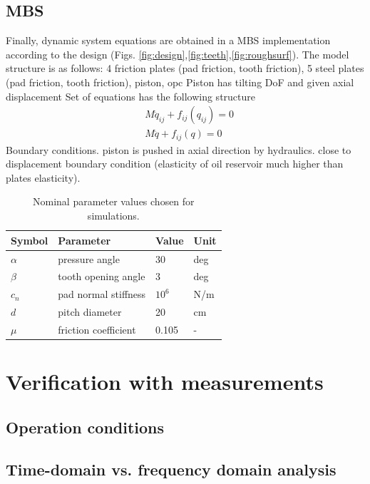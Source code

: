 \documentclass[a4paper,fleqn]{cas-dc}
\begin{document}
\subsection{MBS}
Finally, dynamic system equations are obtained in a MBS implementation according to the design (Figs. \ref{fig:design},\ref{fig:teeth},\ref{fig:roughsurf}). The model structure is as follows: 
4 friction plates (pad friction, tooth friction),
5 steel plates (pad friction, tooth friction), 
piston, 
opc
Piston has tilting DoF and given axial displacement 
Set of equations has the following structure 
\begin{align}
	&{M}\ddot{{q}}_{ij} + f_{ij}(q_{ij}) = 0\\
	&{M}\ddot{{q}} + f_{ij}(q) = 0
\end{align}
Boundary conditions. piston is pushed in axial direction by hydraulics. close to displacement boundary condition (elasticity of oil reservoir much higher than plates elasticity).
\begin{table}[width=.9\linewidth,cols=4,pos=h]
	\caption{Nominal parameter values chosen for simulations.}\label{tab:parameters}
\begin{tabular*}{\tblwidth}{@{} LLLL@{} }
	\toprule
	Symbol & Parameter & Value & Unit\\
	\midrule
	$\alpha$ & pressure angle & 30 & deg \\
	$\beta$ & tooth opening angle & 3 & deg \\
	$c_n$ & pad normal stiffness & $10^6$ & N/m\\
	$d$ & pitch diameter & 20 & cm \\
	$\mu$ & friction coefficient & 0.105 & - \\
	\bottomrule
\end{tabular*}
\end{table}

\section{Verification with measurements}
\subsection{Operation conditions}
\subsection{Time-domain vs. frequency domain analysis}
\end{document}
